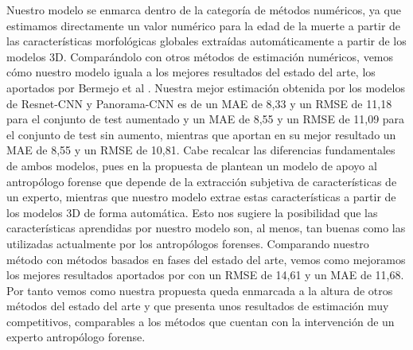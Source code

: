 Nuestro modelo se enmarca dentro de la categoría de métodos numéricos, ya que estimamos directamente un valor numérico para la edad de la muerte a partir de las características morfológicas globales extraídas automáticamente a partir de los modelos 3D. Comparándolo con otros métodos de estimación numéricos, vemos cómo nuestro modelo iguala a los mejores resultados del estado del arte, los aportados por Bermejo et al \cite{villegas_TFG}. Nuestra mejor estimación obtenida por los modelos de Resnet-CNN y Panorama-CNN es de un MAE de 8,33 y un RMSE de 11,18 para el conjunto de test aumentado y un MAE de 8,55 y un RMSE de 11,09 para el conjunto de test sin aumento, mientras que \cite{villegas_TFG} aportan en su mejor resultado un MAE de 8,55 y un RMSE de 10,81. Cabe recalcar las diferencias fundamentales de ambos modelos, pues en la propuesta de \cite{villegas_TFG} plantean un modelo de apoyo al antropólogo forense que depende de la extracción subjetiva de características de un experto, mientras que nuestro modelo extrae estas características a partir de los modelos 3D de forma automática. Esto nos sugiere la posibilidad que las características aprendidas por nuestro modelo son, al menos, tan buenas como las utilizadas actualmente por los antropólogos forenses. Comparando nuestro método con métodos basados en fases del estado del arte, vemos como mejoramos los mejores resultados aportados por \cite{gámez_irurita_gonzález_damas_alemán_cordón_2021} con un RMSE de 14,61 y un MAE de 11,68. Por tanto vemos como nuestra propuesta queda enmarcada a la altura de otros métodos del estado del arte y que presenta unos resultados de estimación muy competitivos, comparables a los métodos que cuentan con la intervención de un experto antropólogo forense.